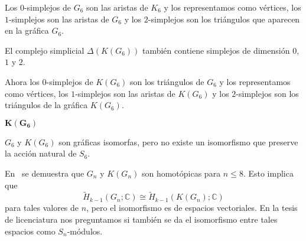 \documentclass[final,xcolor=svgnames]{beamer}
\begin{document}
\begin{frame}{}
\begin{columns}
\begin{column}{0.5\textwidth}
\begin{block}{}
\begin{minipage}{0.46\linewidth}
     Los $0$-simplejos de $G_{6}$ son las  aristas de $K_{6}$ y los
     representamos como vértices, los $1$-simplejos son las aristas de $G_{6}$ y
     los $2$-simplejos son los triángulos que aparecen en la gráfica $G_{6}$.      
   \end{minipage}

   \begin{minipage}{0.5\linewidth}\qquad

     El complejo simplicial $\Delta(K(G_{6}))$ también contiene simplejos de
     dimensión $0$, $1$ y $2$.

     Ahora los $0$-simplejos de $K(G_{6})$ son los triángulos de $G_{6}$ y los
     representamos como vértices, los $1$-simplejos son las aristas de $K(G_{6})$ y
     los $2$-simplejos son los triángulos de la gráfica $K(G_{6})$. 
   \end{minipage}\qquad
   \begin{minipage}{0.43\linewidth} 
      \begin{center}
       
      \alert{$\boldsymbol{K(G_{6})}$}
     \end{center}
   \end{minipage}

   \begin{minipage}{1.0\linewidth}\qquad
     
     \begin{small}
       $G_6$ y $K(G_6)$ son gráficas isomorfas, pero no existe un
       isomorfismo que preserve la acción natural de $S_6.$
     \end{small}
   \end{minipage}
 \end{block}

\begin{block}{}
  En~\cite{chessboard-graphs} se demuestra que $G_{n}$ y $K(G_{n})$
  son homotópicas para $n\leq 8$. Esto implica que
  \begin{equation}
    \label{ecuacion}
    \widetilde H_{k-1}(G_{n};\mathbb{C})\cong \widetilde H_{k-1}(K(G_{n});\mathbb{C})
  \end{equation}
  para tales valores de $n$, pero el isomorfismo es de espacios
  vectoriales. En la tesis de licenciatura nos preguntamos si también
  se da el isomorfismo entre tales espacios \alert{como $S_{n}$-módulos}.
\end{block}


\end{column}
\end{columns}
\end{frame}
\end{document}
